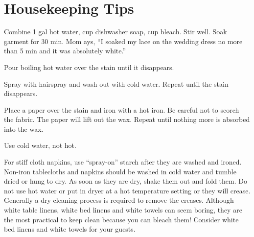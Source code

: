 \chapter*{Housekeeping Tips}

 \par
\begin{minipage}{\linewidth}
Combine 1 gal hot water,  cup dishwasher soap,  cup bleach. Stir well. Soak garment for 30 min.  Mom ays, ``I soaked my lace on the wedding dress no more than 5 min and it was absolutely white.''
\end{minipage}\par

\begin{minipage}{\linewidth}
Pour boiling hot water over the stain until it disappears.
\end{minipage}\par

\begin{minipage}{\linewidth}
Spray with hairspray and wash out with cold water. Repeat until the stain disappears.
\end{minipage}\par

\begin{minipage}{\linewidth}
Place a paper over the stain and iron with a hot iron. Be careful not to scorch the fabric. The paper will lift out the wax. Repeat until nothing more is absorbed into the wax.
\end{minipage}\par

\begin{minipage}{\linewidth}
Use cold water, not hot.
\end{minipage}\par

\begin{minipage}{\linewidth}
For stiff cloth napkins, use ``spray-on'' starch after they are washed and ironed.
Non-iron tablecloths and napkins should be washed in cold water and tumble dried or hung to dry. As soon as they are dry, shake them out and fold them. Do not use hot water or put in dryer at a hot temperature setting or they will crease. Generally a dry-cleaning process is required to remove the creases.
Although white table linens, white bed linens and white towels can seem boring, they are the most practical to keep clean because you can bleach them! Consider white bed linens and white towels for your guests.
\end{minipage}\par


